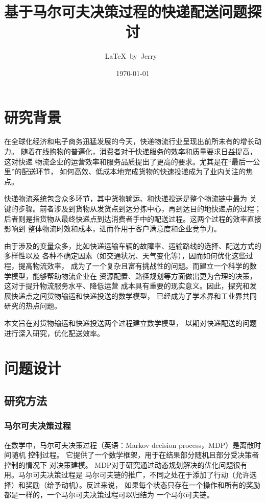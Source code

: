 \documentclass[UTF8]{ctexart}
\title{基于马尔可夫决策过程的快递配送问题探讨}
\author{\LaTeX\ by\ Jerry\ }
\date{\today}
\begin{document}
\fancyfoot[C]{\thepage}

\maketitle
\tableofcontents
\newpage

\section{研究背景}

在全球化经济和电子商务迅猛发展的今天，快递物流行业呈现出前所未有的增长动力。
随着在线购物的普遍化，消费者对于快递服务的效率和质量要求日益提高，这对快递
物流企业的运营效率和服务品质提出了更高的要求。尤其是在“最后一公里”的配送环节，
如何高效、低成本地完成货物的快速投递成为了业内关注的焦点。

快递物流系统包含众多环节，其中货物输运、和快递投送是整个物流链中最为
关键的步骤。前者涉及到货物从发货点到达分拣中心，再到达目的地快递点的过程；
后者则是指货物从最终快递点到达消费者手中的配送过程。这两个过程的效率直接影响到
整体物流时效和成本，进而作用于客户满意度和企业竞争力。

由于涉及的变量众多，比如快递运输车辆的故障率、运输路线的选择、配送方式的多样性以及
各种不确定因素（如交通状况、天气变化等），因而如何优化这些过程，提高物流效率，
成为了一个复杂且富有挑战性的问题。而建立一个科学的数学模型，能够帮助物流企业在
资源配置、路径规划等方面做出更为合理的决策，这对于提升物流服务水平、降低运营
成本具有重要的现实意义。因此，探究和发展快递点之间货物输运和快递投送的数学模型，
已经成为了学术界和工业界共同研究的热点问题。

本文旨在对货物输运和快递投送两个过程建立数学模型，
以期对快递配送的问题进行深入研究，优化配送效率。\cite{Sample}

\section{问题设计}

\subsection{研究方法}

\subsubsection{马尔可夫决策过程}

在数学中，马尔可夫决策过程（英语：Markov decision process，MDP）是离散时间随机
控制过程。 它提供了一个数学框架，用于在结果部分随机且部分受决策者控制的情况下
对决策建模。 MDP对于研究通过动态规划解决的优化问题很有用。马尔可夫决策过程是
马尔可夫链的推广，不同之处在于添加了行动（允许选择）和奖励（给予动机）。反过来说，
如果每个状态只存在一个操作和所有的奖励都是一样的，一个马尔可夫决策过程可以归结为
一个马尔可夫链。\cite{WikiMDP}
\end{document}
